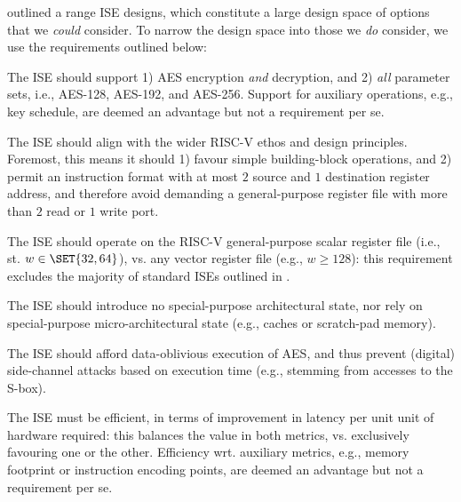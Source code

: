 
outlined a range ISE designs, which constitute a large design space of
options that we {\em could} consider.  To narrow the design space into
those we {\em do} consider, we use the requirements outlined below:

\begin{requirement}\label{req:1}
The ISE should support
1) AES encryption {\em and} decryption,
   and
2) {\em all} parameter sets, i.e., AES-128, AES-192, and AES-256.
Support for 
auxiliary operations, e.g., key schedule, 
are deemed an advantage but not a requirement per se.
\end{requirement}

\begin{requirement}\label{req:2}
The ISE should align with the wider RISC-V ethos and design principles.
Foremost, this means it should 
1) favour simple building-block operations,
   and
2) permit an instruction format with at most $2$ source and $1$ destination register address,
   and therefore avoid demanding a general-purpose register file with more than $2$ read or
   $1$ write port.
\end{requirement}

\begin{requirement}\label{req:3}
The ISE should operate on 
the RISC-V general-purpose scalar register file 
(i.e., st. $w \in \SET{ 32, 64 }$),
vs. 
any                        vector register file
(e.g., $w \ge 128$):
this requirement excludes the majority of standard ISEs outlined in 
.
\end{requirement}

\begin{requirement}\label{req:4}
The ISE should introduce no
special-purpose       architectural state, 
nor rely on
special-purpose micro-architectural state
(e.g., caches or scratch-pad memory).
\end{requirement}

\begin{requirement}\label{req:5}
The ISE should afford data-oblivious execution of AES, and thus prevent 
(digital) side-channel attacks based on execution time 
(e.g., stemming from accesses to the S-box).
\end{requirement}

\begin{requirement}
The ISE must be efficient, in terms of improvement in latency per unit
unit of hardware required: this balances the value in both metrics, vs.
exclusively favouring one or the other.
Efficiency wrt. 
auxiliary metrics, e.g., memory footprint or instruction encoding points,
are deemed an advantage but not a requirement per se.
\end{requirement}

